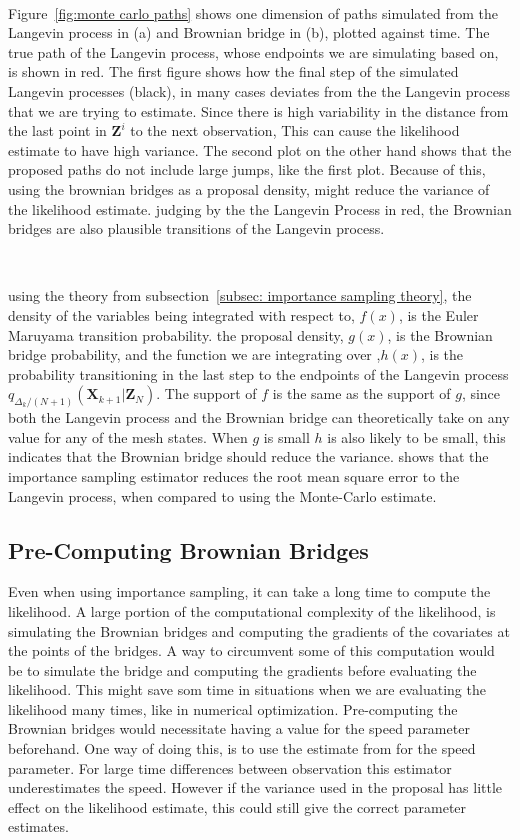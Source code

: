 \

Figure~\ref{fig:monte carlo paths} shows one dimension of paths simulated from the Langevin process in (a) and Brownian bridge in (b), plotted against time. The true path of the Langevin process, whose endpoints we are simulating based on, is shown in red. The first figure shows how the final step of the simulated Langevin processes (black), in many cases deviates from the the Langevin process that we are trying to estimate. Since there is high variability in the distance from the last point in $\textbf{Z}^i$ to the next observation, This can cause the likelihood estimate to have high variance. The second plot on the other hand shows that the proposed paths do not include large jumps, like the first plot. Because of this, using the brownian bridges as a proposal density, might reduce the variance of the likelihood estimate. judging by the the Langevin Process in red, the Brownian bridges are also plausible transitions of the Langevin process. 

\

using the theory from subsection~\ref{subsec: importance sampling theory}, the density of the variables being integrated with respect to, $f(x)$, is the Euler Maruyama transition probability. the proposal density, $g(x)$, is the Brownian bridge probability, and the function we are integrating over ,$h(x)$, is the probability transitioning in the last step to the endpoints of the Langevin process $q_{\Delta_k/(N+1)}(\textbf{X}_{k+1}|\textbf{Z}_N)$. The support of $f$ is the same as the support of $g$, since both the Langevin process and the Brownian bridge can theoretically take on any value for any of the mesh states. When $g$ is small $h$ is also likely to be small, this indicates that the Brownian bridge should reduce the variance. \parencite{durham_numerical_2002}  shows that the importance sampling estimator reduces the root mean square error to the Langevin process, when compared to using the Monte-Carlo estimate.


\subsection{Pre-Computing Brownian Bridges}
\label{subsec: precomputing brownian bridges}
Even when using importance sampling, it can take a long time to compute the likelihood. A large portion of the computational complexity of the likelihood, is simulating the Brownian bridges and computing the gradients of the covariates at the points of the bridges. A way to circumvent some of this computation would be to simulate the bridge and computing the gradients before evaluating the likelihood. This might save som time in situations when we are evaluating the likelihood many times, like in numerical optimization. Pre-computing the Brownian bridges would necessitate having a value for the speed parameter beforehand. One way of doing this, is to use the estimate from \parencite{michelot_langevin_2019} for the speed parameter. For large time differences between observation this estimator underestimates the speed. However if the variance used in the proposal has little effect on the likelihood estimate, this could still give the correct parameter estimates. 




